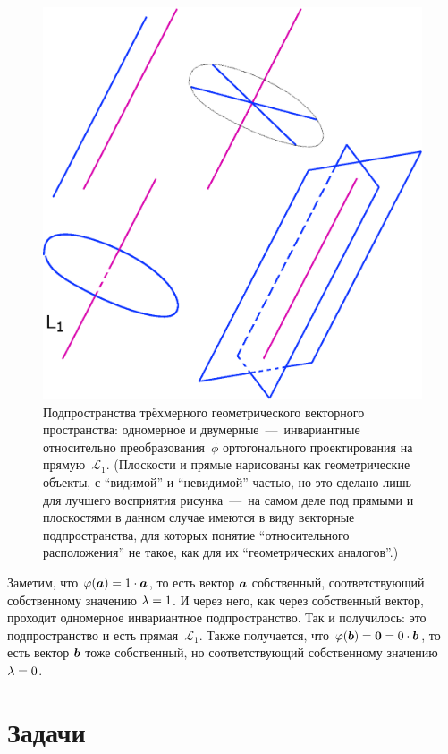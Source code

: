 \documentclass[a4paper,12pt]{article}
\begin{document}
\begin{example}
\begin{figure}[h]
      \includegraphics[width=0.75\columnwidth]{inv-subspaces}
  
      \caption{Подпространства трёхмерного геометрического векторного пространства: одномерное и двумерные~---~инвариантные относительно преобразования~$\phi$ ортогонального проектирования на прямую~$\mathcal L_1$. (Плоскости и прямые нарисованы как геометрические объекты, с ``видимой'' и ``невидимой'' частью, но это сделано лишь для лучшего восприятия рисунка~---~на самом деле под прямыми и плоскостями в данном случае имеются в виду векторные подпространства, для которых понятие ``относительного расположения'' не такое, как для их ``геометрических аналогов''.)}
      \label{fig:inv-subspaces}
    \end{figure}
    
    Заметим, что
    $
      \phi(\bds a) \hm= 1 \cdot \bds a
    $,
    то есть вектор $\boldsymbol a$ собственный, соответствующий собственному значению $\lambda \hm= 1$.
    И через него, как через собственный вектор, проходит одномерное инвариантное подпространство.
    Так и получилось: это подпространство и есть прямая~$\mathcal L_1$.
    Также получается, что
    $
      \phi(\bds b) \hm= \bds 0 \hm= 0 \cdot \bds b
    $,
    то есть вектор $\boldsymbol b$ тоже собственный, но соответствующий собственному значению $\lambda \hm= 0$.
  \end{example}
  
  
  \section{Задачи}
  
\end{document}
